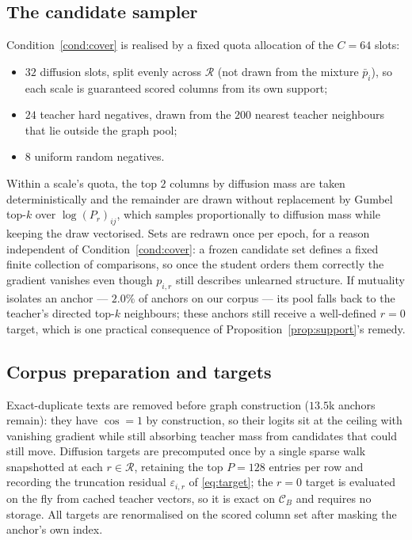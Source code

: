 \subsection{The candidate sampler}

Condition~\ref{cond:cover} is realised by a fixed quota allocation of the $C=64$ slots:
\begin{itemize}
    \item $32$ diffusion slots, split evenly across $\mathcal{R}$ (not drawn from the
    mixture $\bar p_i$), so each scale is guaranteed scored columns from its own support;
    \item $24$ teacher hard negatives, drawn from the $200$ nearest teacher neighbours that
    lie outside the graph pool;
    \item $8$ uniform random negatives.
\end{itemize}
Within a scale's quota, the top $2$ columns by diffusion mass are taken deterministically
and the remainder are drawn without replacement by Gumbel top-$k$ over
$\log (P_r)_{ij}$, which samples proportionally to diffusion mass while keeping the draw
vectorised. Sets are redrawn once per epoch, for a reason independent of
Condition~\ref{cond:cover}: a frozen candidate set defines a fixed finite collection of
comparisons, so once the student orders them correctly the gradient vanishes even though
$p_{i,r}$ still describes unlearned structure. If mutuality isolates an anchor --- $2.0\%$ of
anchors on our corpus --- its pool falls back to the teacher's directed top-$k$ neighbours;
these anchors still receive a well-defined $r=0$ target, which is one practical consequence
of Proposition~\ref{prop:support}'s remedy.

\subsection{Corpus preparation and targets}

Exact-duplicate texts are removed before graph construction ($13.5$k anchors remain): they
have $\cos=1$ by construction, so their logits sit at the ceiling with vanishing gradient
while still absorbing teacher mass from candidates that could still move.
Diffusion targets are precomputed once by a single sparse walk snapshotted at each
$r\in\mathcal{R}$, retaining the top $P=128$ entries per row and recording the truncation
residual $\varepsilon_{i,r}$ of \eqref{eq:target}; the $r=0$ target is evaluated on the fly
from cached teacher vectors, so it is exact on $\mathcal{C}_B$ and requires no storage. All
targets are renormalised on the scored column set after masking the anchor's own index.

